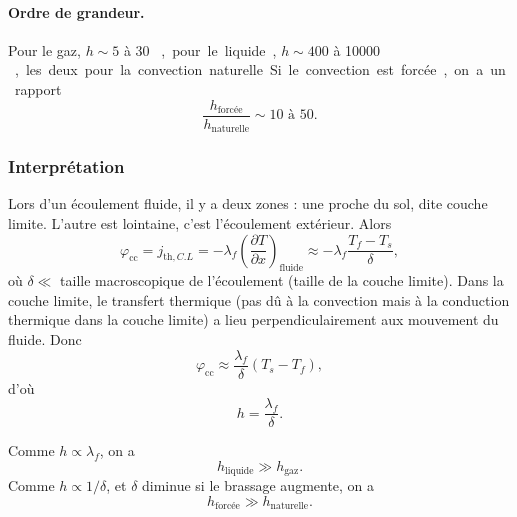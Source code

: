             \paragraph{Ordre de grandeur.} Pour le gaz, $h\sim 5$ à 30 \si[]{\watt\per\metre\square\per\kelvin}, pour le liquide, $h\sim 400$ à 10000 \si[]{\watt\per\metre\square\per\kelvin}, les deux pour la convection naturelle. Si le convection est forcée, on a un rapport 
            \begin{equation*}
                \frac{h_{\text{forcée}}}{h_{\text{naturelle}}}\sim 10\text{ à }50.
            \end{equation*}

        \subsubsection{Interprétation}

            Lors d'un écoulement fluide, il y a deux zones : une proche du sol, dite \og couche limite\fg. L'autre est lointaine, c'est l'écoulement extérieur. Alors
            \begin{equation*}
                \varphi_{\text{cc}}=j_{\text{th},C.L}=-\lambda_f\left(\frac{\partial T}{\partial x}\right)_{\text{fluide}}\approx-\lambda_f\frac{T_f-T_s}{\delta},
            \end{equation*}
            où $\delta\ll$ taille macroscopique de l'écoulement (taille de la couche limite). Dans la couche limite, le transfert thermique (pas dû à la convection mais à la conduction thermique dans la couche limite) a lieu perpendiculairement aux mouvement du fluide. Donc 
            \begin{equation*}
                \varphi_{\text{cc}}\approx\frac{\lambda_f}{\delta}\left(T_s-T_f\right),
            \end{equation*}
            d'où
            \begin{equation*}
                \boxed{
                    h=\frac{\lambda_f}{\delta}.
                }
            \end{equation*}

            Comme $h\propto\lambda_f$, on a 
            \begin{equation*}
                \boxed{
                    h_{\text{liquide}}\gg h_{\text{gaz}}.
                }
            \end{equation*}
            Comme $h\propto1/\delta$, et $\delta$ diminue si le brassage augmente, on a 
            \begin{equation*}
                \boxed{
                    h_{\text{forcée}}\gg h_{\text{naturelle}}.
                }
            \end{equation*}

